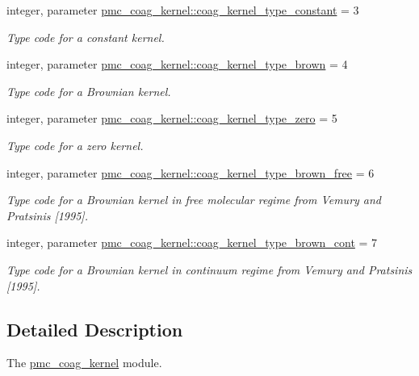 \begin{DoxyCompactItemize}
integer, parameter \mbox{\hyperlink{namespacepmc__coag__kernel_a6706cc1fc48d83cd5fbca4bba57d60b2}{pmc\+\_\+coag\+\_\+kernel\+::coag\+\_\+kernel\+\_\+type\+\_\+constant}} = 3
\begin{DoxyCompactList}\small\item\em Type code for a constant kernel. \end{DoxyCompactList}\item 
integer, parameter \mbox{\hyperlink{namespacepmc__coag__kernel_aa6a324c3d911cbc50a287ebb1b873535}{pmc\+\_\+coag\+\_\+kernel\+::coag\+\_\+kernel\+\_\+type\+\_\+brown}} = 4
\begin{DoxyCompactList}\small\item\em Type code for a Brownian kernel. \end{DoxyCompactList}\item 
integer, parameter \mbox{\hyperlink{namespacepmc__coag__kernel_a6d75eae86113c1790f98fe66147bcdcc}{pmc\+\_\+coag\+\_\+kernel\+::coag\+\_\+kernel\+\_\+type\+\_\+zero}} = 5
\begin{DoxyCompactList}\small\item\em Type code for a zero kernel. \end{DoxyCompactList}\item 
integer, parameter \mbox{\hyperlink{namespacepmc__coag__kernel_ac11bbcea41051f4b2e16769f2a78fc94}{pmc\+\_\+coag\+\_\+kernel\+::coag\+\_\+kernel\+\_\+type\+\_\+brown\+\_\+free}} = 6
\begin{DoxyCompactList}\small\item\em Type code for a Brownian kernel in free molecular regime from Vemury and Pratsinis \mbox{[}1995\mbox{]}. \end{DoxyCompactList}\item 
integer, parameter \mbox{\hyperlink{namespacepmc__coag__kernel_ad1ce21ef5a0a9dff8f2efe6267f22c52}{pmc\+\_\+coag\+\_\+kernel\+::coag\+\_\+kernel\+\_\+type\+\_\+brown\+\_\+cont}} = 7
\begin{DoxyCompactList}\small\item\em Type code for a Brownian kernel in continuum regime from Vemury and Pratsinis \mbox{[}1995\mbox{]}. \end{DoxyCompactList}\end{DoxyCompactItemize}


\subsection{Detailed Description}
The \mbox{\hyperlink{namespacepmc__coag__kernel}{pmc\+\_\+coag\+\_\+kernel}} module. 

